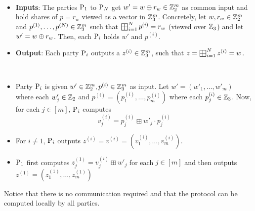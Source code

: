 \begin{functionality}
~
\begin{itemize}

    \item \textbf{Inputs}: The parties $\textnormal{P}_1$ to $\textnormal{P}_N$ get $w' = w \oplus r_w \in \mathbb{Z}_2^m$ as common input and hold shares of $p = r_w$ viewed as a vector in $\mathbb{Z}_3^m$. Concretely, let $w, r_w \in \mathbb{Z}_2^m$ and $p^{(1)}, \dots, p^{(N)} \in \mathbb{Z}_3^m$ such that $\bigboxplus_{i=1}^N p^{(i)} = r_w$ (viewed over $\mathbb{Z}_3$) and let $w' = w \oplus r_w$. Then, each $\textnormal{P}_i$ holds $w'$ and $p^{(i)}$.


    \item \textbf{Output}: Each party $\textnormal{P}_i$ outputs a $z^{(i)} \in \mathbb{Z}_3^m$, such that $z = \bigboxplus_{i=1}^N z^{(i)} = w$.
\end{itemize}
\label{functionality:mod23-convert}
\end{functionality}


\begin{protocol}
~
\begin{itemize}
    \item Party $\textnormal{P}_i$ is given $w' \in \mathbb{Z}_2^m, p^{(i)} \in \mathbb{Z}_3^m$ as input. Let $w' = (w'_1, \dots, w'_m)$ where each $w'_j \in \mathbb{Z}_2$ and $p^{(i)} = (p^{(i)}_1, \dots, p^{(i)}_m)$ where each $p^{(i)}_j \in \mathbb{Z}_3$. Now, for each $j \in [m]$, $\textnormal{P}_i$ computes
    \[
        v^{(i)}_j = p^{(i)}_j \boxplus w'_j \cdot p^{(i)}_j
    \]
    \item For $i \neq 1$, $\textnormal{P}_i$ outputs $z^{(i)} = v^{(i)} = (v^{(i)}_1, \dots, v^{(i)}_m)$.
    \item $\textnormal{P}_1$ first computes $z^{(1)}_j = v^{(i)}_j \boxplus w'_j$ for each $j \in [m]$ and then outputs $z^{(1)} = (z^{(1)}_1, \dots, z^{(1)}_m)$
\end{itemize}
Notice that there is no communication required and that the protocol can be computed locally by all parties.
\label{prot:mod23-convert}
\end{protocol}

